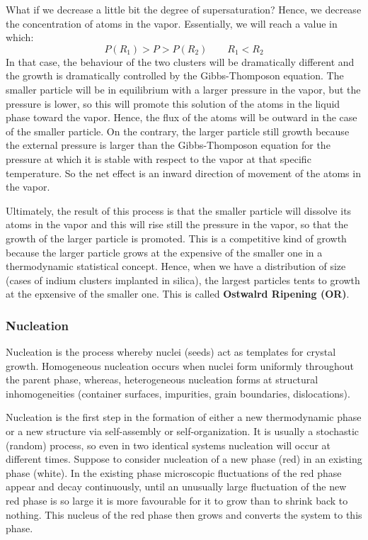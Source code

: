 \documentclass[../main/main.tex]{subfiles}
\begin{document}
What if we decrease a little bit the degree of supersaturation? Hence, we decrease the concentration of atoms in the vapor. Essentially, we will reach a value in which:
\begin{equation*}
  P(R_1) > P > P(R_2) \quad \quad R_1 < R_2
\end{equation*}
In that case, the behaviour of the two clusters will be dramatically different and the growth is dramatically controlled by the Gibbs-Thomposon equation. The smaller particle will be in equilibrium with a larger pressure in the vapor, but the pressure is lower, so this will promote this solution of the atoms in the liquid phase toward the vapor. Hence, the flux of the atoms will be outward in the case of the smaller particle. On the contrary, the larger particle still growth because the external pressure is larger than the Gibbs-Thomposon equation for the pressure at which it is stable with respect to the vapor at that specific temperature. So the net effect is an inward direction of movement of the atoms in the vapor.

Ultimately, the result of this process is that the smaller particle will dissolve its atoms in the vapor and this will rise still the pressure in the vapor, so that the growth of the larger particle is promoted. This is a competitive kind of growth because the larger particle grows at the expensive of the smaller one in a thermodynamic statistical concept.
Hence, when we have a distribution of size (cases of indium clusters implanted in silica), the largest particles tents to growth at the epxensive of the smaller one. This is called \textbf{Ostwalrd Ripening (OR)}.

\subsubsection{Nucleation}
Nucleation is the process whereby nuclei (seeds) act as templates for crystal growth. Homogeneous nucleation occurs when nuclei form uniformly throughout the parent phase, whereas, heterogeneous nucleation forms at structural inhomogeneities (container surfaces, impurities, grain boundaries, dislocations).

Nucleation is the first step in the formation of either a new thermodynamic phase or a new structure via self-assembly or self-organization. It is  usually a stochastic (random) process, so even in two identical systems nucleation will occur at different times. Suppose to consider nucleation of a new phase (red) in an existing phase (white). In the existing phase microscopic fluctuations of the red phase appear and decay continuously, until an unusually large fluctuation of the new red phase is so large it is more favourable for it to grow than to shrink back to nothing. This nucleus of the red phase then grows and converts the system to this phase.



\clearpage
\end{document}
